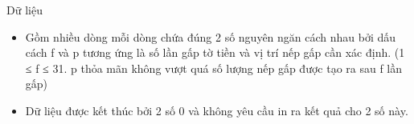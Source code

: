 Dữ liệu
\begin{itemize}
	\item     Gồm nhiều dòng mỗi dòng chứa đúng 2 số nguyên ngăn cách nhau bởi dấu cách f và p tương ứng là số lần gấp tờ tiền và vị trí nếp gấp cần xác định. (1 ≤ f ≤ 31. p thỏa mãn không vượt quá số lượng nếp gấp được tạo ra sau f lần gấp)   
	\item     Dữ liệu được kết thúc bởi 2 số 0 và không yêu cầu in ra kết quả cho 2 số này.   
\end{itemize}